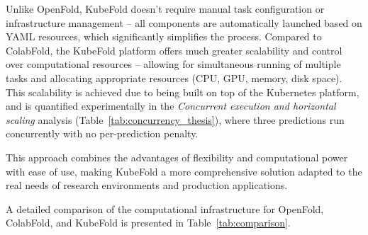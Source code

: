 Unlike OpenFold, KubeFold doesn't require manual task configuration or infrastructure management – all components are automatically launched based on YAML resources, which significantly simplifies the process.
Compared to ColabFold, the KubeFold platform offers much greater scalability and control over computational resources – allowing for simultaneous running of multiple tasks and allocating appropriate resources (CPU, GPU, memory, disk space).
This scalability is achieved due to being built on top of the Kubernetes platform, and is quantified experimentally in the \textit{Concurrent execution and horizontal scaling} analysis (Table~\ref{tab:concurrency_thesis}), where three predictions run concurrently with no per-prediction penalty.

This approach combines the advantages of flexibility and computational power with ease of use, making KubeFold a more comprehensive solution adapted to the real needs of research environments and production applications.

A detailed comparison of the computational infrastructure for OpenFold, ColabFold, and KubeFold is presented in Table~\ref{tab:comparison}.

